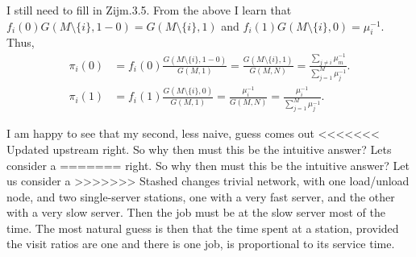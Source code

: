 \begin{exercise}
\begin{solution}
I still need to fill in Zijm.3.5. From the above I learn that
$f_i(0) G(M\setminus\{i\}, 1-0) = G(M\setminus\{i\}, 1)$ and
$f_i(1) G(M\setminus\{i\}, 0) = \mu_i^{-1}$. 
Thus, 
\begin{align*}
 \pi_i(0) &= f_i(0) \frac{G(M\setminus\{i\}, 1-0)}{G(M,1)} = \frac{G(M\setminus\{i\}, 1)}{G(M,N)} = 
\frac{\sum_{j\neq i} \mu_m^{-1}}{\sum_{j=1}^M \mu_j^{-1}}.
\\
 \pi_i(1) &= f_i(1) \frac{G(M\setminus\{i\}, 0)}{G(M,1)} = \frac{\mu_i^{-1}}{G(M,N)} = \frac{\mu_i^{-1}}{\sum_{j=1}^M \mu_j^{-1}}.
\end{align*}

I am happy to see that my second, less naive, guess comes out
<<<<<<< Updated upstream
right. So why then must this be the intuitive answer? Lets consider a
=======
right. So why then must this be the intuitive answer? Let us consider a
>>>>>>> Stashed changes
trivial network, with one load/unload node, and two single-server
stations, one with a very fast server, and the other with a very slow
server. Then the job must be at the slow server most of the time. The
most natural guess is then that the time spent at a station, provided
the visit ratios are one and there is one job, is proportional to its
service time.
\end{solution}
\end{exercise}


